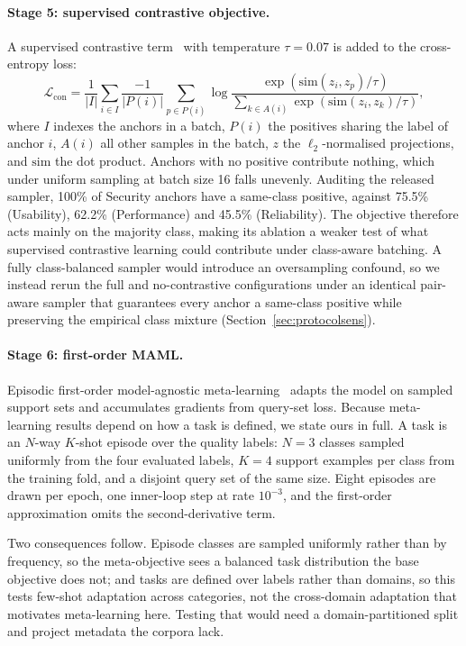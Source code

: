 \documentclass[11pt,a4paper]{article}
\begin{document}
\paragraph{Stage 5: supervised contrastive objective.}
A supervised contrastive term~\cite{khosla2020} with temperature $\tau = 0.07$ is added to
the cross-entropy loss:
\begin{equation}
\mathcal{L}_{\mathrm{con}}
= \frac{1}{|I|}\sum_{i \in I} \frac{-1}{|P(i)|}
\sum_{p \in P(i)} \log
\frac{\exp\!\left(\mathrm{sim}(z_i,z_p)/\tau\right)}
{\sum_{k \in A(i)}\exp\!\left(\mathrm{sim}(z_i,z_k)/\tau\right)} ,
\end{equation}
where $I$ indexes the anchors in a batch, $P(i)$ the positives sharing the label of anchor
$i$, $A(i)$ all other samples in the batch, $z$ the $\ell_2$-normalised projections, and
$\mathrm{sim}$ the dot product. Anchors with no positive contribute nothing, which under uniform sampling at batch size 16
falls unevenly. Auditing the released sampler, 100\% of Security anchors have a same-class
positive, against 75.5\% (Usability), 62.2\% (Performance) and 45.5\% (Reliability). The
objective therefore acts mainly on the majority class, making its ablation a weaker test of
what supervised contrastive learning could contribute under class-aware batching. A fully class-balanced sampler would introduce an oversampling confound, so we instead rerun the full and
no-contrastive configurations under an identical pair-aware sampler that guarantees every anchor a
same-class positive while preserving the empirical class mixture (Section~\ref{sec:protocolsens}).

\paragraph{Stage 6: first-order MAML.}
Episodic first-order model-agnostic meta-learning~\cite{finn2017} adapts the model on
sampled support sets and accumulates gradients from query-set loss. Because meta-learning results depend on how a task is defined, we state ours in full. A task is an $N$-way $K$-shot episode over the quality labels: $N = 3$ classes sampled
uniformly from the four evaluated labels, $K = 4$ support examples per class from the training
fold, and a disjoint query set of the same size. Eight episodes are drawn per epoch, one inner-loop step
at rate $10^{-3}$, and the first-order approximation omits the second-derivative term.

Two consequences follow. Episode classes are sampled uniformly rather than by frequency, so
the meta-objective sees a balanced task distribution the base objective does not; and tasks are
defined over labels rather than domains, so this tests few-shot adaptation across categories,
not the cross-domain adaptation that motivates meta-learning here. Testing that would need a
domain-partitioned split and project metadata the corpora lack.
\end{document}
